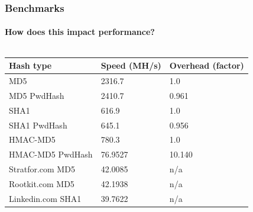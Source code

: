 \documentclass[handout, notes=hide]{beamer}
\begin{document}
\begin{frame}
\frametitle{Benchmarks}
\framesubtitle{How does this impact performance?}
\setlength{\parskip}{0.5em}

\begin{columns}[T]
\begin{column}[T]{1.0\textwidth}

\fontsize{9pt}{14}\selectfont

\begin{tabular}{p{4cm}|p{2.8cm}|p{2.8cm}}
	{\bf Hash type} & {\bf Speed (MH/s)} & {\bf Overhead (factor)} \\ \hline
	MD5 & 2316.7 & 1.0 \\
	MD5 PwdHash & 2410.7 & 0.961 \\
	SHA1 & 616.9 & 1.0 \\
	SHA1 PwdHash & 645.1 & 0.956 \\
	HMAC-MD5 & 780.3 & 1.0 \\
	HMAC-MD5 PwdHash & 76.9527 & 10.140 \\
	Stratfor.com MD5 & 42.0085 & n/a \\
	Rootkit.com MD5 & 42.1938 & n/a \\
	Linkedin.com SHA1 & 39.7622 & n/a \\
\end{tabular}%

\end{column}
\end{columns}

\end{frame}
\end{document}
